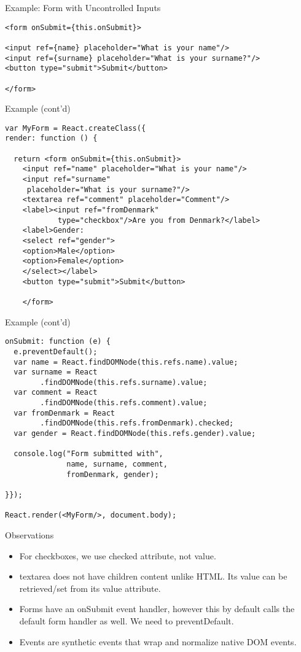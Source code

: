 \documentclass[presentation]{beamer}
\begin{document}
\begin{frame}[fragile,label=sec-4]{Example: Form with Uncontrolled Inputs}
 \begin{verbatim}
<form onSubmit={this.onSubmit}>

<input ref={name} placeholder="What is your name"/>
<input ref={surname} placeholder="What is your surname?"/>
<button type="submit">Submit</button>

</form>
\end{verbatim}
\end{frame}

\begin{frame}[fragile,label=sec-5]{Example (cont'd)}
 \begin{verbatim}
var MyForm = React.createClass({
render: function () {

  return <form onSubmit={this.onSubmit}>
    <input ref="name" placeholder="What is your name"/>
    <input ref="surname"
     placeholder="What is your surname?"/>
    <textarea ref="comment" placeholder="Comment"/>
    <label><input ref="fromDenmark"
            type="checkbox"/>Are you from Denmark?</label>
    <label>Gender:
    <select ref="gender">
    <option>Male</option>
    <option>Female</option>
    </select></label>
    <button type="submit">Submit</button>

    </form>
\end{verbatim}
\end{frame}


\begin{frame}[fragile,label=sec-6]{Example (cont'd)}
 \begin{verbatim}
onSubmit: function (e) {
  e.preventDefault();
  var name = React.findDOMNode(this.refs.name).value;
  var surname = React
        .findDOMNode(this.refs.surname).value;
  var comment = React
        .findDOMNode(this.refs.comment).value;
  var fromDenmark = React
        .findDOMNode(this.refs.fromDenmark).checked;
  var gender = React.findDOMNode(this.refs.gender).value;

  console.log("Form submitted with",
              name, surname, comment,
              fromDenmark, gender);

}});

React.render(<MyForm/>, document.body);
\end{verbatim}
\end{frame}

\begin{frame}[label=sec-7]{Observations}
\begin{itemize}
\item For checkboxes, we use checked attribute, not value.
\item textarea does not have children content unlike HTML. Its value can be
retrieved/set from its value attribute.
\item Forms have an onSubmit event handler, however this by default calls the
default form handler as well. We need to preventDefault.
\item Events are synthetic events that wrap and normalize native DOM events.
\end{itemize}
\end{frame}
\end{document}

